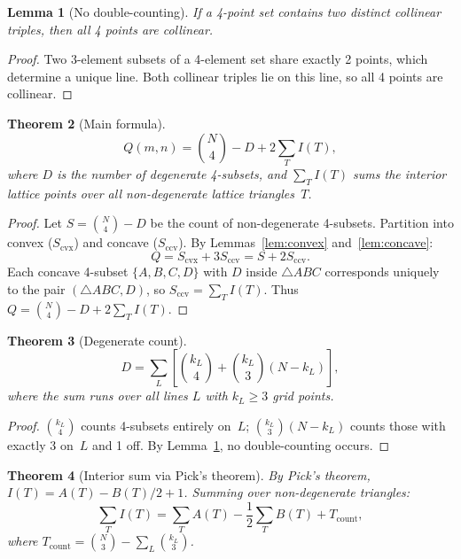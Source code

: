 \documentclass[12pt,a4paper]{article}
\newtheorem{theorem}{Theorem}
\newtheorem{lemma}[theorem]{Lemma}
\begin{document}
\begin{lemma}[No double-counting]\label{lem:nocross}
If a 4-point set contains two distinct collinear triples, then all 4 points are collinear.
\end{lemma}

\begin{proof}
Two 3-element subsets of a 4-element set share exactly 2 points, which determine a unique line. Both collinear triples lie on this line, so all 4 points are collinear.
\end{proof}

\begin{theorem}[Main formula]\label{thm:main}
\[
Q(m,n) = \binom{N}{4} - D + 2 \sum_T I(T),
\]
where $D$ is the number of degenerate 4-subsets, and $\sum_T I(T)$ sums the interior lattice points over all non-degenerate lattice triangles~$T$.
\end{theorem}

\begin{proof}
Let $S = \binom{N}{4} - D$ be the count of non-degenerate 4-subsets. Partition into convex ($S_{\text{cvx}}$) and concave ($S_{\text{ccv}}$). By Lemmas~\ref{lem:convex} and~\ref{lem:concave}:
\[
Q = S_{\text{cvx}} + 3 S_{\text{ccv}} = S + 2 S_{\text{ccv}}.
\]
Each concave 4-subset $\{A,B,C,D\}$ with $D$ inside $\triangle ABC$ corresponds uniquely to the pair $(\triangle ABC, D)$, so $S_{\text{ccv}} = \sum_T I(T)$. Thus $Q = \binom{N}{4} - D + 2\sum_T I(T)$.
\end{proof}

\begin{theorem}[Degenerate count]\label{thm:degen}
\[
D = \sum_{L} \left[\binom{k_L}{4} + \binom{k_L}{3}(N - k_L)\right],
\]
where the sum runs over all lines $L$ with $k_L \ge 3$ grid points.
\end{theorem}

\begin{proof}
$\binom{k_L}{4}$ counts 4-subsets entirely on~$L$; $\binom{k_L}{3}(N-k_L)$ counts those with exactly 3 on~$L$ and 1 off. By Lemma~\ref{lem:nocross}, no double-counting occurs.
\end{proof}

\begin{theorem}[Interior sum via Pick's theorem]\label{thm:pick}
By Pick's theorem, $I(T) = A(T) - B(T)/2 + 1$. Summing over non-degenerate triangles:
\[
\sum_T I(T) = \sum_T A(T) - \frac{1}{2}\sum_T B(T) + T_{\mathrm{count}},
\]
where $T_{\mathrm{count}} = \binom{N}{3} - \sum_L \binom{k_L}{3}$.
\end{theorem}
\end{document}

